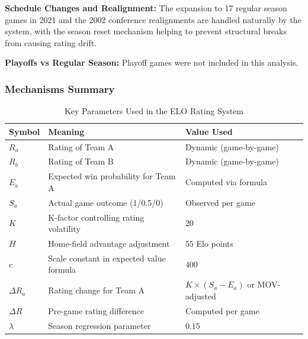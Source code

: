\documentclass[a4paper,10.5pt,twoside]{article}
\begin{document}
\textbf{Schedule Changes and Realignment:} The expansion to 17 regular season games in 2021 and the 2002 conference realignments are handled naturally by the system, with the season reset mechanism helping to prevent structural breaks from causing rating drift.

\textbf{Playoffs vs Regular Season:} Playoff games were not included in this analysis. 

\subsubsection{Mechanisms Summary}


\begin{table}[h!]
\centering
\caption{Key Parameters Used in the ELO Rating System}
\begin{tabular}{lll}
\hline
\textbf{Symbol} & \textbf{Meaning} & \textbf{Value Used} \\
\hline
$R_a$ & Rating of Team A & Dynamic (game-by-game) \\
$R_b$ & Rating of Team B & Dynamic (game-by-game) \\
$E_a$ & Expected win probability for Team A & Computed via formula \\
$S_a$ & Actual game outcome (1/0.5/0) & Observed per game \\
$K$ & K-factor controlling rating volatility & $20$ \\
$H$ & Home-field advantage adjustment & $55$ Elo points \\
$c$ & Scale constant in expected value formula & $400$ \\
$\Delta R_a$ & Rating change for Team A & $K \times (S_a - E_a)$ or MOV-adjusted \\
$\Delta R$ & Pre-game rating difference & Computed per game \\
$\lambda$ & Season regression parameter & $0.15$ \\
\hline
\end{tabular}
\end{table}
\end{document}
